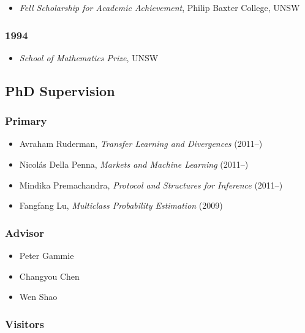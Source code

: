 \documentclass{article}
\begin{document}
\begin{itemize}%
\item \emph{Fell Scholarship for Academic Achievement}, Philip Baxter College, UNSW

\end{itemize}
\hypertarget{1994}{}\subsubsection*{{1994}}\label{1994}

\begin{itemize}%
\item \emph{School of Mathematics Prize}, UNSW

\end{itemize}
\hypertarget{phd_supervision}{}\subsection*{{PhD Supervision}}\label{phd_supervision}

\hypertarget{primary}{}\subsubsection*{{Primary}}\label{primary}

\begin{itemize}%
\item Avraham Ruderman, \emph{Transfer Learning and Divergences} (2011--{})
\item Nicolás Della Penna, \emph{Markets and Machine Learning} (2011--{})
\item Mindika Premachandra, \emph{Protocol and Structures for Inference} (2011--{})
\item Fangfang Lu, \emph{Multiclass Probability Estimation} (2009)

\end{itemize}
\hypertarget{advisor}{}\subsubsection*{{Advisor}}\label{advisor}

\begin{itemize}%
\item Peter Gammie
\item Changyou Chen
\item Wen Shao

\end{itemize}
\hypertarget{visitors}{}\subsubsection*{{Visitors}}\label{visitors}
\end{document}
